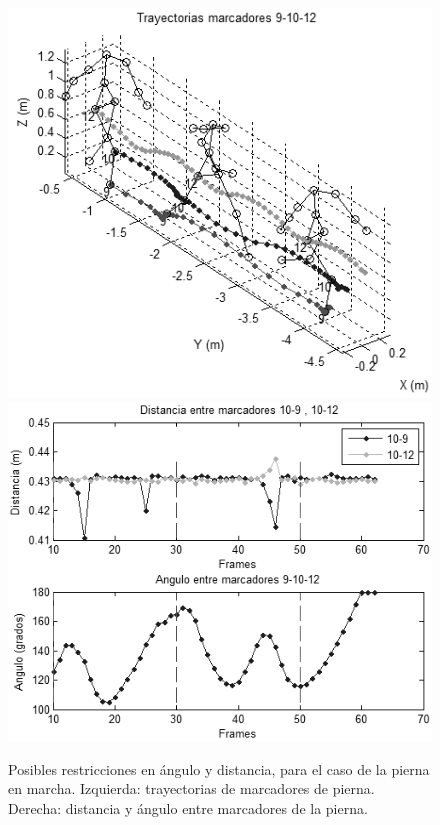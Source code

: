 \begin{figure}[ht!]
 \begin{center}
  {\includegraphics[scale=0.4]{imagenes/Seguimiento/050_Salida_Tracking_13_14_10.png} %
   }	
 {\includegraphics[scale=0.4]{imagenes/Seguimiento/051_Salida_Angulo_Distancia_13_14_10.png}\label{distancia_angulo_marcadores_piernas}}
  \end{center}
\caption{Posibles restricciones en ángulo y distancia, para el caso de la pierna en marcha. Izquierda: trayectorias de marcadores de pierna. Derecha: distancia y ángulo entre marcadores de la pierna.}
\label{restricciones_tracking}
\end{figure}

